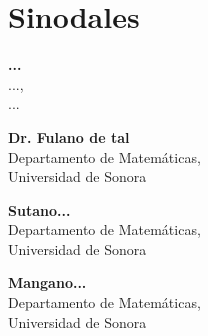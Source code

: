 \chapter*{Sinodales}

\noindent \textbf{...}\\
...,\\
...
\bigskip

\noindent \textbf{Dr. Fulano de tal}\\
Departamento de Matem\'aticas,\\
Universidad de Sonora
\bigskip


\noindent \textbf{Sutano...}\\
Departamento de Matem\'aticas,\\
Universidad de Sonora
\bigskip


\noindent \textbf{Mangano...}\\
Departamento de Matem\'aticas,\\
Universidad de Sonora
\bigskip

